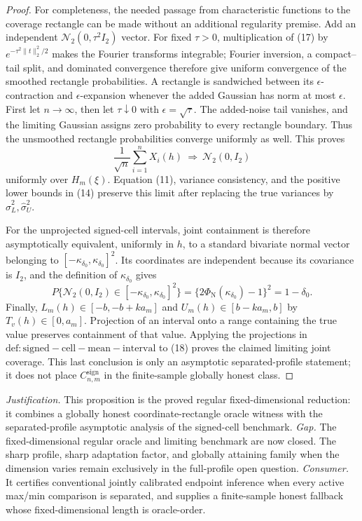 \documentclass{article}
\begin{document}
\begin{proof}
For completeness, the needed passage from characteristic functions to the coverage rectangle can be made without an additional regularity premise. Add an independent \(\mathcal N_2(0,\tau^2I_2)\) vector. For fixed \(\tau>0\), multiplication of (17) by \(e^{-\tau^2\|t\|_2^2/2}\) makes the Fourier transforms integrable; Fourier inversion, a compact--tail split, and dominated convergence therefore give uniform convergence of the smoothed rectangle probabilities. A rectangle is sandwiched between its \(\epsilon\)-contraction and \(\epsilon\)-expansion whenever the added Gaussian has norm at most \(\epsilon\). First let \(n\to\infty\), then let \(\tau\downarrow0\) with \(\epsilon=\sqrt\tau\). The added-noise tail vanishes, and the limiting Gaussian assigns zero probability to every rectangle boundary. Thus the unsmoothed rectangle probabilities converge uniformly as well. This proves
\[
 \frac1{\sqrt n}\sum_{i=1}^{n}X_i(h)\ \Longrightarrow\ \mathcal N_2(0,I_2)
\]
uniformly over \(H_m(\xi)\). Equation (11), variance consistency, and the positive lower bounds in (14) preserve this limit after replacing the true variances by \(\widehat\sigma_L^2,\widehat\sigma_U^2\).

For the unprojected signed-cell intervals, joint containment is therefore asymptotically equivalent, uniformly in \(h\), to a standard bivariate normal vector belonging to \([-\kappa_{\delta_0},\kappa_{\delta_0}]^2\). Its coordinates are independent because its covariance is \(I_2\), and the definition of \(\kappa_{\delta_0}\) gives
\[
 P\{\mathcal N_2(0,I_2)\in[-\kappa_{\delta_0},\kappa_{\delta_0}]^2\}
 =\{2\Phi_{\mathrm N}(\kappa_{\delta_0})-1\}^2=1-\delta_0.             \tag{18}
\]
Finally, \(L_m(h)\in[-b,-b+ka_m]\) and \(U_m(h)\in[b-ka_m,b]\) by \(T_v(h)\in[0,a_m]\). Projection of an interval onto a range containing the true value preserves containment of that value. Applying the projections in \(\mathrm{def:signed-cell-mean-interval}\) to (18) proves the claimed limiting joint coverage. This last conclusion is only an asymptotic separated-profile statement; it does not place \(C^{\mathrm{sign}}_{n,m}\) in the finite-sample globally honest class.
\end{proof}
\par\smallskip\noindent \textit{Justification.} This proposition is the proved regular fixed-dimensional reduction: it combines a globally honest coordinate-rectangle oracle witness with the separated-profile asymptotic analysis of the signed-cell benchmark. \textit{Gap.} The fixed-dimensional regular oracle and limiting benchmark are now closed. The sharp profile, sharp adaptation factor, and globally attaining family when the dimension varies remain exclusively in the full-profile open question. \textit{Consumer.} It certifies conventional jointly calibrated endpoint inference when every active max/min comparison is separated, and supplies a finite-sample honest fallback whose fixed-dimensional length is oracle-order.
\end{document}
